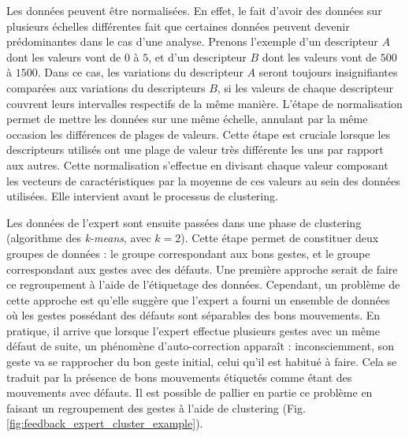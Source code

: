 Les données peuvent être normalisées. En effet, le fait d'avoir des données sur plusieurs échelles différentes fait que certaines données peuvent devenir prédominantes dans le cas d'une analyse. Prenons l'exemple d'un descripteur $A$ dont les valeurs vont de $0$ à $5$, et d'un descripteur $B$ dont les valeurs vont de $500$ à $1500$. Dans ce cas, les variations du descripteur $A$ seront toujours insignifiantes comparées aux variations du descripteurs $B$, si les valeurs de chaque descripteur couvrent leurs intervalles respectifs de la même manière. L'étape de normalisation permet de mettre les données sur une même échelle, annulant par la même occasion les différences de plages de valeurs. Cette étape est cruciale lorsque les descripteurs utilisés ont une plage de valeur très différente les uns par rapport aux autres. Cette normalisation s'effectue en divisant chaque valeur composant les vecteurs de caractéristiques par la moyenne de ces valeurs au sein des données utilisées. Elle intervient avant le processus de clustering.

Les données de l'expert sont ensuite passées dans une phase de clustering (algorithme des \textit{k-means}, avec $k = 2$). Cette étape permet de constituer deux groupes de données : le groupe correspondant aux bons gestes, et le groupe correspondant aux gestes avec des défauts. Une première approche serait de faire ce regroupement à l'aide de l'étiquetage des données. Cependant, un problème de cette approche est qu'elle suggère que l'expert a fourni un ensemble de données où les gestes possédant des défauts sont séparables des bons mouvements. En pratique, il arrive que lorsque l'expert effectue plusieurs gestes avec un même défaut de suite, un phénomène d'auto-correction apparaît : inconsciemment, son geste va se rapprocher du bon geste initial, celui qu'il est habitué à faire. Cela se traduit par la présence de bons mouvements étiquetés comme étant des mouvements avec défauts. Il est possible de pallier en partie ce problème en faisant un regroupement des gestes à l'aide de clustering (Fig. \ref{fig:feedback_expert_cluster_example}).


